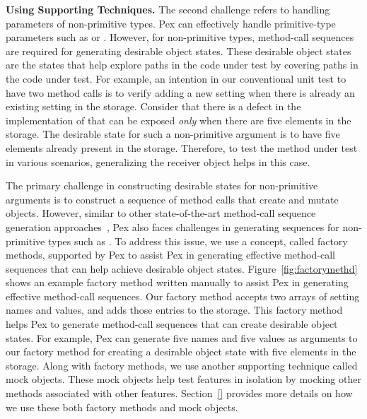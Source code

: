 \textbf{Using Supporting Techniques.} The second challenge refers to handling parameters of non-primitive types. Pex can effectively handle primitive-type parameters such as  or . However, for non-primitive types, method-call sequences are required for generating desirable object states. These desirable object states are the states that help explore paths in the code under test by covering paths in the code under test. For example, an intention in our conventional unit test to have two  method calls is to verify adding a new setting when there is already an existing setting in the storage. Consider that there is a defect in the  implementation of  that can be exposed \emph{only} when there are five elements in the storage. The desirable state for such a non-primitive argument is to have five elements already present in the storage. Therefore, to test the method under test in various scenarios, generalizing the receiver object helps in this case. 

The primary challenge in constructing desirable states for non-primitive arguments is to construct a sequence of method calls that create and mutate objects. However, similar to other state-of-the-art method-call sequence generation approaches~\cite{}, Pex also faces challenges in generating sequences for non-primitive types such as . To address this issue, we use a concept, called factory methods, supported by Pex to assist Pex in generating effective method-call sequences that can help achieve desirable object states. Figure~\ref{fig:factorymethd} shows an example factory method written manually to assist Pex in generating effective method-call sequences. Our factory method accepts two arrays of setting names and values, and adds those entries to the storage. This factory method helps Pex to generate method-call sequences that can create desirable object states. For example, Pex can generate five names and five values as arguments to our factory method for creating a desirable object state with five elements in the storage. Along with factory methods, we use another supporting technique called mock objects. These mock objects help test features in isolation by mocking other methods associated with other features. Section~\ref{} provides more details on how we use these both factory methods and mock objects.

